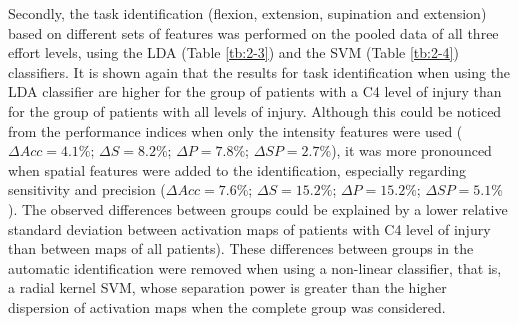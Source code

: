 Secondly, the task identification (flexion, extension, supination and extension) based on different sets of features was performed on the pooled data of all three effort levels, using the LDA (Table \ref{tb:2-3}) and the SVM (Table \ref{tb:2-4}) classifiers. It is shown again that the results for task identification when using the LDA classifier are higher for the group of patients with a C4 level of injury than for the group of patients with all levels of injury. Although this could be noticed from the performance indices when only the intensity features were used ($\Delta Acc= 4.1\%$; $\Delta S= 8.2\%$; $\Delta P= 7.8\%$; $\Delta SP= 2.7\%$), it was more pronounced when spatial features were added to the identification, especially regarding sensitivity and precision ($\Delta Acc= 7.6\%$; $\Delta S= 15.2\%$; $\Delta P= 15.2\%$; $\Delta SP= 5.1\%$). The observed differences between groups could be explained by a lower relative standard deviation between activation maps of patients with C4 level of injury than between maps of all patients). These differences between groups in the automatic identification were removed when using a non-linear classifier, that is, a radial kernel SVM, whose separation power is greater than the higher dispersion of activation maps when the complete group was considered.

